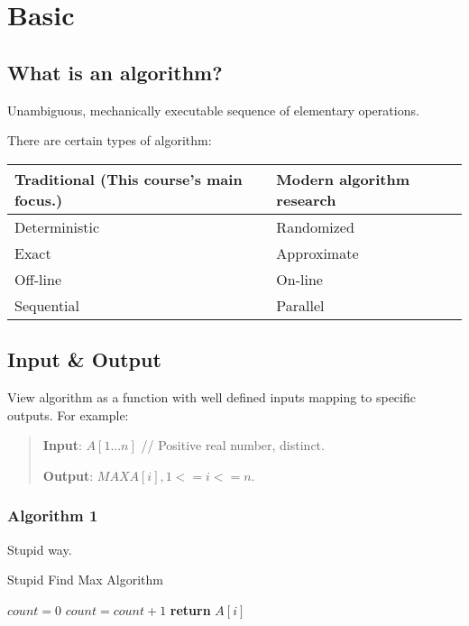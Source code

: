 \section{Basic}
\subsection{What is an algorithm?}
Unambiguous, mechanically executable sequence of elementary operations.

There are certain types of algorithm:

\begin{tabular}{ ll }
Traditional (This course’s main focus.) & Modern algorithm research\\
\hline
Deterministic & Randomized \\
Exact & Approximate\\
Off-line & On-line\\
Sequential & Parallel\\
\end{tabular}

\subsection{Input \& Output}

View algorithm as a function with well defined inputs mapping to specific
outputs. For example:

\begin{quote}

\textbf{Input}: $A[1...n]$  // Positive real number, distinct.

\textbf{Output}: $MAX A[i], 1<= i <= n$.

\end{quote}

\subsubsection{Algorithm 1}

Stupid way.

\begin{algorithm}[H]
\caption{Stupid Find Max Algorithm}\label{Stupid_Find_Max_Algorithm}
\begin{algorithmic}[1]
  \State $count = 0$
      \State $count = count + 1$
    \EndIf
  \EndFor
    \State \textbf{return} {$A[i]$}
  \EndIf
\EndFor
\EndProcedure
\end{algorithmic}
\end{algorithm}

